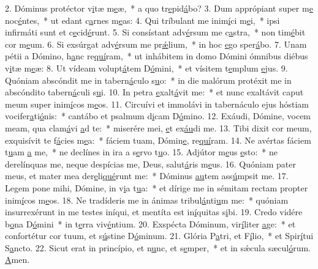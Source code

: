 2. Dóminus protéctor v\uline{i}tæ m\uline{e}æ,~* a quo tr\uline{e}pid\uline{á}bo?
3. Dum apprópiant super m\uline{e} noc\uline{é}ntes,~* ut edant c\uline{a}rnes m\uline{e}as:
4. Qui tríbulant me inim\uline{í}ci m\uline{e}i,~* ipsi infirmáti sunt et c\uline{e}cid\uline{é}runt.
5. Si consístant adv\uline{é}rsum me c\uline{a}stra,~* non tim\uline{é}bit cor m\uline{e}um.
6. Si exsúrgat adv\uline{é}rsum me pr\uline{ǽ}lium,~* in hoc \uline{e}go sper\uline{á}bo.
7. Unam pétii a Dómino, h\uline{a}nc re\uline{quí}ram,~* ut inhábitem in domo Dómini ómnibus diébus v\uline{i}tæ m\uline{e}æ:
8. Ut vídeam volupt\uline{á}tem D\uline{ó}mini,~* et vísitem t\uline{e}mplum \uline{e}jus.
9. Quóniam abscóndit me in tabern\uline{á}culo s\uline{u}o:~* in die malórum protéxit me in abscóndito tabern\uline{á}culi s\uline{u}i.
10. In petra \uline{e}xalt\uline{á}vit me:~* et nunc exaltávit caput meum super inim\uline{í}cos m\uline{e}os.
11. Circuívi et immolávi in tabernáculo ejus hóstiam vocifer\uline{a}ti\uline{ó}nis:~* cantábo et psalmum d\uline{i}cam D\uline{ó}mino.
12. Exáudi, Dómine, vocem meam, qua clam\uline{á}vi \uline{a}d te:~* miserére mei, \uline{e}t ex\uline{áu}di me.
13. Tibi dixit cor meum, exquisívit te f\uline{á}cies m\uline{e}a:~* fáciem tuam, Dómin\uline{e}, re\uline{quí}ram.
14. Ne avértas fáciem t\uline{u}am \uline{a} me,~* ne declínes in ira a s\uline{e}rvo t\uline{u}o.
15. Adjútor m\uline{e}us \uline{e}sto:~* ne derelínquas me, neque despícias me, Deus, salut\uline{á}ris m\uline{e}us.
16. Quóniam pater meus, et mater mea der\uline{e}li\uline{qué}runt me:~* Dóminus \uline{au}tem ass\uline{ú}mpsit me.
17. Legem pone mihi, Dómine, in v\uline{i}a t\uline{u}a:~* et dírige me in sémitam rectam propter inim\uline{í}cos m\uline{e}os.
18. Ne tradíderis me in ánimas tribul\uline{á}nti\uline{u}m me:~* quóniam insurrexérunt in me testes iníqui, et mentíta est in\uline{í}quitas s\uline{i}bi.
19. Credo vidére b\uline{o}na D\uline{ó}mini~* in t\uline{e}rra viv\uline{é}ntium.
20. Exspécta Dóminum, vir\uline{í}liter \uline{a}ge:~* et confortétur cor tuum, et s\uline{ú}stine D\uline{ó}minum.
21. Glória P\uline{a}tri, et F\uline{í}lio,~* et Spir\uline{í}tui S\uline{a}ncto.
22. Sicut erat in princípio, et n\uline{u}nc, et s\uline{e}mper,~* et in sǽcula sæcul\uline{ó}rum. \uline{A}men.
